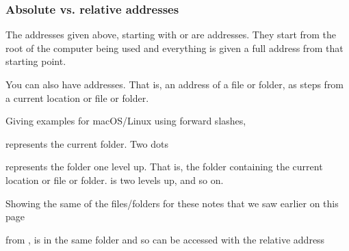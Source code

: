 \documentclass[letterpaper,10pt,british]{sphinxmanual}
\let\sphinxpxdimen\pdfpxdimen\else\newdimen\sphinxpxdimen
\begin{document}
\subsubsection{Absolute vs. relative addresses}
\label{\detokenize{chapters/computer_software/files_and_folders:absolute-vs-relative-addresses}}
\sphinxAtStartPar
The addresses given above, starting with  or  are  addresses. They start from the root of the computer being used and everything is given a full address from that starting point.

\sphinxAtStartPar
You can also have  addresses. That is, an address of a file or folder, as steps from a current location or file or folder.

\sphinxAtStartPar
Giving examples for macOS/Linux using forward slashes,

\begin{sphinxVerbatim}[commandchars=\\\{\}]
\end{sphinxVerbatim}

\sphinxAtStartPar
represents the current folder. Two dots

\begin{sphinxVerbatim}[commandchars=\\\{\}]
\end{sphinxVerbatim}

\sphinxAtStartPar
represents the folder one level up. That is, the folder containing the current location or file or folder.  is two levels up, and so on.

\sphinxAtStartPar
Showing the same  of the files/folders for these notes that we saw earlier on this page

\begin{figure}[htbp]
\centering

\noindent\sphinxincludegraphics[width=300\sphinxpxdimen]{{tree_view}.png}
\end{figure}

\sphinxAtStartPar
from ,  is in the same folder and so can be accessed with the relative address

\begin{sphinxVerbatim}[commandchars=\\\{\}]
\end{sphinxVerbatim}
\end{document}
